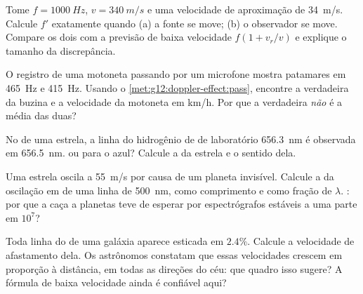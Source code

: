 \begin{exercise}[$\star\star$]\label{exo:g12:doppler-effect:9}
Tome $f = \qty{1000}{Hz}$, $v = \qty{340}{m/s}$ e uma velocidade de
aproximação de \qty{34}{m/s}. Calcule $f'$ exatamente quando (a) a fonte
se move; (b) o observador se move. Compare os dois com a previsão de
baixa velocidade $f(1 + v_r/v)$ e explique o tamanho da discrepância.
\end{exercise}

\begin{exercise}[$\star\star$]\label{exo:g12:doppler-effect:10}
O registro de uma motoneta passando por um microfone mostra patamares em
\qty{465}{Hz} e \qty{415}{Hz}. Usando o
\cref{met:g12:doppler-effect:pass}, encontre a  verdadeira da
buzina e a velocidade da motoneta em \unit{km/h}. Por que a 
verdadeira \emph{não} é a média das duas?
\end{exercise}

\begin{exercise}[$\star\star$]\label{exo:g12:doppler-effect:11}
No  de uma estrela, a linha do hidrogênio de 
de laboratório \qty{656.3}{nm} é observada em \qty{656.5}{nm}.  ou para o azul? Calcule a  da estrela e
o sentido dela.
\end{exercise}

\begin{exercise}[$\star\star\star$]\label{exo:g12:doppler-effect:12}
Uma estrela oscila a \qty{55}{m/s} por causa de um planeta invisível.
Calcule a  da oscilação em  de uma linha de
\qty{500}{nm}, como comprimento e como fração de $\lambda$. : por que a caça a planetas teve de esperar por espectrógrafos
estáveis a uma parte em $10^{7}$?
\end{exercise}

\begin{exercise}[$\star\star\star$]\label{exo:g12:doppler-effect:13}
Toda linha do  de uma galáxia aparece esticada em $2.4\%$.
Calcule a velocidade de afastamento dela. Os astrônomos constatam que
essas velocidades crescem em proporção à distância, em todas as direções
do céu: que quadro isso sugere? A fórmula de baixa velocidade ainda é
confiável aqui?
\end{exercise}

